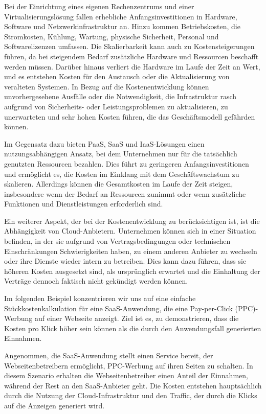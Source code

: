 Bei der Einrichtung eines eigenen Rechenzentrums und einer Virtualisierungslösung fallen erhebliche Anfangsinvestitionen in Hardware, Software und Netzwerkinfrastruktur an. Hinzu kommen Betriebskosten, die Stromkosten, Kühlung, Wartung, physische Sicherheit, Personal und Softwarelizenzen umfassen. Die Skalierbarkeit kann auch zu Kostensteigerungen führen, da bei steigendem Bedarf zusätzliche Hardware und Ressourcen beschafft werden müssen. Darüber hinaus verliert die Hardware im Laufe der Zeit an Wert, und es entstehen Kosten für den Austausch oder die Aktualisierung von veralteten Systemen. In Bezug auf die Kostenentwicklung können unvorhergesehene Ausfälle oder die Notwendigkeit, die Infrastruktur rasch aufgrund von Sicherheits- oder Leistungsproblemen zu aktualisieren, zu unerwarteten und sehr hohen Kosten führen, die das Geschäftsmodell gefährden können.

Im Gegensatz dazu bieten PaaS, SaaS und IaaS-Lösungen einen nutzungsabhängigen Ansatz, bei dem Unternehmen nur für die tatsächlich genutzten Ressourcen bezahlen. Dies führt zu geringeren Anfangsinvestitionen und ermöglicht es, die Kosten im Einklang mit dem Geschäftswachstum zu skalieren. Allerdings können die Gesamtkosten im Laufe der Zeit steigen, insbesondere wenn der Bedarf an Ressourcen zunimmt oder wenn zusätzliche Funktionen und Dienstleistungen erforderlich sind.

Ein weiterer Aspekt, der bei der Kostenentwicklung zu berücksichtigen ist, ist die Abhängigkeit von Cloud-Anbietern. Unternehmen können sich in einer Situation befinden, in der sie aufgrund von Vertragsbedingungen oder technischen Einschränkungen Schwierigkeiten haben, zu einem anderen Anbieter zu wechseln oder ihre Dienste wieder intern zu betreiben. Dies kann dazu führen, dass sie höheren Kosten ausgesetzt sind, als ursprünglich erwartet und die Einhaltung der Verträge dennoch faktisch nicht gekündigt werden können.

Im folgenden Beispiel konzentrieren wir uns auf eine einfache Stückkostenkalkulation für eine SaaS-Anwendung, die eine Pay-per-Click (PPC)-Werbung auf einer Webseite anzeigt. Ziel ist es, zu demonstrieren, dass die Kosten pro Klick höher sein können als die durch den Anwendungsfall generierten Einnahmen.

Angenommen, die SaaS-Anwendung stellt einen Service bereit, der Webseitenbetreibern ermöglicht, PPC-Werbung auf ihren Seiten zu schalten. In diesem Szenario erhalten die Webseitenbetreiber einen Anteil der Einnahmen, während der Rest an den SaaS-Anbieter geht. Die Kosten entstehen hauptsächlich durch die Nutzung der Cloud-Infrastruktur und den Traffic, der durch die Klicks auf die Anzeigen generiert wird.


